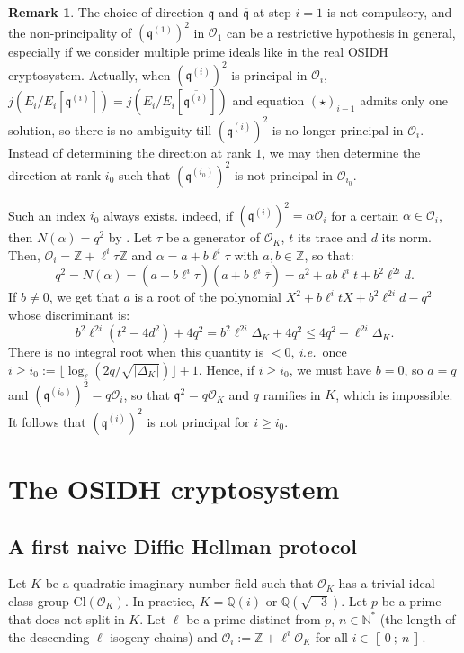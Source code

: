 \documentclass[a4paper,10pt,notitlepage]{report}
\theoremstyle{definition}
\theoremstyle{plain}
\theoremstyle{definition}
\newtheorem{Remark}[Definition]{Remark}
\newcommand{\ie}{\emph{i.e.}\ }
\newcommand{\N}{\mathbb{N}}
\newcommand{\Z}{\mathbb{Z}}
\newcommand{\Q}{\mathbb{Q}}
\newcommand{\mO}{\mathcal{O}}
\renewcommand{\i}[2]{\left\llbracket #1~;~#2\right\rrbracket}
\renewcommand{\(}{\left(}
\renewcommand{\)}{\right)}
\newcommand{\mfq}{\mathfrak{q}}
\begin{document}
\begin{Remark}
The choice of direction $\mfq$ and $\overline{\mfq}$ at step $i=1$ is not compulsory, and the non-principality of $(\mfq^{(1)})^2$ in $\mO_1$ can be a restrictive hypothesis in general, especially if we consider multiple prime ideals like in the real OSIDH cryptosystem. Actually, when $(\mfq^{(i)})^2$ is principal in $\mO_i$, $j(E_i/E_i[\mfq^{(i)}])=j(E_i/E_i[\overline{\mfq^{(i)}}])$ and equation $(\star)_{i-1}$ admits only one solution, so there is no ambiguity till $(\mfq^{(i)})^2$ is no longer principal in $\mO_i$. Instead of determining the direction at rank $1$, we may then determine the direction at rank $i_0$ such that $(\mfq^{(i_0)})^2$ is not principal in $\mO_{i_0}$. 

Such an index $i_0$ always exists.  indeed, if $(\mfq^{(i)})^2=\alpha\mO_i$ for a certain $\alpha\in\mO_i$, then $N(\alpha)=q^2$ by \cite[Lemma 7.14.(i)]{Cox}. Let $\tau$ be a generator of $\mO_K$, $t$ its trace and $d$ its norm. Then,  $\mO_i=\Z+\ell^i\tau\Z$ and $\alpha=a+b\ell^i\tau$ with $a, b\in\Z$, so that:
\[q^2=N(\alpha)=(a+b\ell^i\tau)(a+b\ell^i\overline{\tau})=a^2+ab\ell^it+b^2\ell^{2i}d.\]
If $b\neq 0$, we get that $a$ is a root of the polynomial $X^2+b\ell^itX+b^2\ell^{2i}d-q^2$ whose discriminant is:
\[b^2\ell^{2i}(t^2-4d^2)+4q^2=b^2\ell^{2i}\Delta_K+4q^2\leq 4q^2+\ell^{2i}\Delta_K.\]
There is no integral root when this quantity is $<0$, \ie once $i\geq i_0:=\lfloor \log_\ell(2q/\sqrt{|\Delta_K|})\rfloor +1$. Hence, if $i\geq i_0$, we must have $b=0$, so $a=q$ and $(\mfq^{(i_0)})^2=q\mO_i$, so that $\mfq^2=q\mO_K$ and $q$ ramifies in $K$, which is impossible. It follows that $(\mfq^{(i)})^2$ is not principal for $i\geq i_0$.
\end{Remark}


\chapter{The OSIDH cryptosystem}

\section{A first naive Diffie Hellman protocol}\label{Paragraph 15}

Let $K$ be a quadratic imaginary number field such that $\mO_K$ has a trivial ideal class group $\mbox{Cl}(\mO_K)$. In practice, $K=\Q(i)$ or $\Q(\sqrt{-3})$. Let $p$ be a prime that does not split in $K$. Let $\ell$ be a prime distinct from $p$, $n\in\N^*$ (the length of the descending $\ell$-isogeny chains) and $\mO_i:=\Z+\ell^i\mO_K$ for all $i\in\i{0}{n}$.
\end{document}
